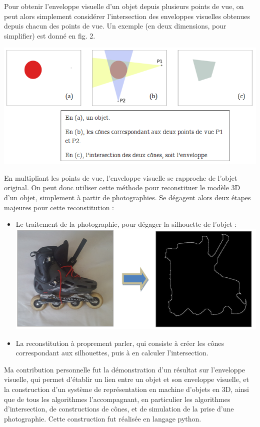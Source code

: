 \documentclass[a4paper]{article}
\begin{document}
      Pour obtenir l’enveloppe visuelle d’un objet depuis plusieurs points de vue, on peut alors simplement considérer l’intersection des enveloppes visuelles obtenues depuis chacun des points de vue. Un exemple (en deux dimensions, pour simplifier) est donné en fig. 2.

      \includegraphics[width=\textwidth]{ScreenSchema2}

      En multipliant les points de vue, l’enveloppe visuelle se rapproche de l’objet original. On peut donc utiliser cette méthode pour reconstituer le modèle 3D d’un objet, simplement à partir de photographies. Se dégagent alors deux étapes majeures pour cette reconstitution :

      \begin{itemize}
        \item Le traitement de la photographie, pour dégager la silhouette de l’objet :\\
        \includegraphics[width=\linewidth]{ContourDetect}
        \item La reconstitution à proprement parler, qui consiste à créer les cônes correspondant aux silhouettes, puis à en calculer l’intersection.
      \end{itemize}


      Ma contribution personnelle fut la démonstration d’un résultat sur l’enveloppe visuelle, qui permet d’établir un lien entre un objet et son enveloppe visuelle, et la construction d’un système de représentation en machine d’objets en 3D, ainsi que de tous les algorithmes l’accompagnant, en particulier les algorithmes d’intersection, de constructions de cônes, et de simulation de la prise d’une photographie. Cette construction fut réalisée en langage python.
\end{document}
